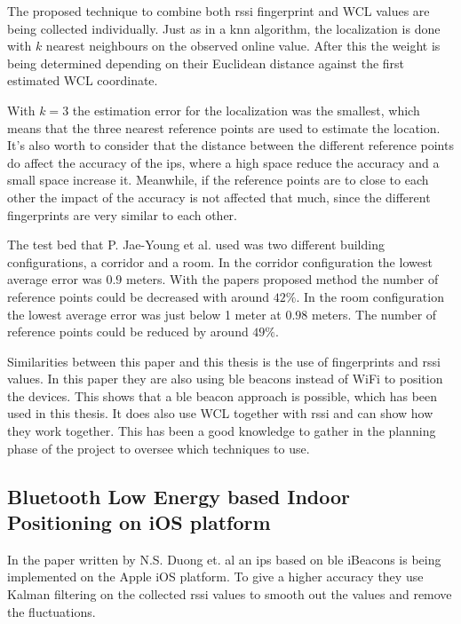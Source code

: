 \bigskip

The proposed technique to combine both \acrshort{rssi} fingerprint and WCL values are being collected individually.
Just as in a \acrshort{knn} algorithm, the localization is done with $k$ nearest neighbours on the observed online value.
After this the weight is being determined depending on their Euclidean distance against the first estimated WCL coordinate.

\bigskip

With $k=3$ the estimation error for the localization was the smallest, which means that the three nearest reference points are used to estimate the location.
It's also worth to consider that the distance between the different reference points do affect the accuracy of the \acrshort{ips}, where a high space reduce the accuracy and a small space increase it.
Meanwhile, if the reference points are to close to each other the impact of the accuracy is not affected that much, since the different fingerprints are very similar to each other.

\bigskip

The test bed that P. Jae-Young et al. used was two different building configurations, a corridor and a room.
In the corridor configuration the lowest average error was $0.9$ meters. 
With the papers proposed method the number of reference points could be decreased with around $42\%$.
In the room configuration the lowest average error was just below 1 meter at $0.98$ meters.
The number of reference points could be reduced by around $49\%$.

\bigskip

Similarities between this paper and this thesis is the use of fingerprints and \acrshort{rssi} values.
In this paper they are also using \acrshort{ble} beacons instead of WiFi to position the devices.
This shows that a \acrshort{ble} beacon approach is possible, which has been used in this thesis.
It does also use WCL together with \acrshort{rssi} and can show how they work together.
This has been a good knowledge to gather in the planning phase of the project to oversee which techniques to use.


\subsection{Bluetooth Low Energy based Indoor Positioning on iOS platform}
In the paper \cite{BluetoothLowEnergy2018} written by N.S. Duong et. al an \acrshort{ips} based on \acrshort{ble} iBeacons is being implemented on the Apple iOS platform.
To give a higher accuracy they use Kalman filtering on the collected \acrshort{rssi} values to smooth out the values and remove the fluctuations.

